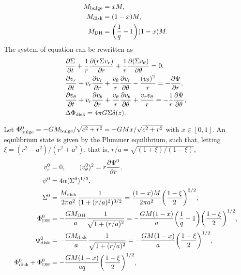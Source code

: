 \documentclass[11pt]{article}
\newcommand{\vr}{v_{r}}
\newcommand{\vt}{v_{\theta}}
\newcommand{\Sigmad}{\Sigma_{\rm{disk}}}
\newcommand{\Phib}{\Phi_{\rm{bulge}}}
\newcommand{\Phid}{\Phi_{\rm{disk}}}
\newcommand{\Phidh}{\Phi_{\rm{DH}}}
\newcommand{\Mb}{M_{\rm{bulge}}}
\newcommand{\Md}{M_{\rm{disk}}}
\newcommand{\Mdh}{M_{\rm{DH}}}
\newcommand{\Msg}{M_{\rm{sg}}}
\begin{document}
\begin{align*}
\Mb &= x M,\\
\Md &= (1 - x)M  ,\\
\Mdh &= \bigg(\frac{1}{q}-1\bigg) (1-x) M.
\end{align*}
The system of equation can be rewritten as 
\begin{align}
&\frac{\partial \Sigma}{\partial t} + \frac{1}{r} \frac{\partial(r\Sigma \vr)}{\partial r} + \frac{1}{r} \frac{\partial(\Sigma \vt)}{\partial \theta} = 0 ,\\
&\frac{\partial \vr}{\partial t} + \vr \frac{\partial \vr}{\partial r} + \frac{\vt}{r} \frac{\partial \vr}{\partial \theta} - \frac{(\vt)^2}{r} = -\frac{\partial \Psi}{\partial r} ,\\
&\frac{\partial \vt}{\partial t} + \vr \frac{\partial \vt}{\partial r} + \frac{\vt}{r} \frac{\partial \vt}{\partial \theta} + \frac{\vr\vt}{r} = -\frac{1}{r}\frac{\partial \Psi}{\partial \theta} ,\\
& \Delta \Phid = 4\pi G \Sigma \delta (z).
\end{align}

 Let $\Phib^0 = - G \Mb/\sqrt{c^2+r^2}=- G  M x/\sqrt{c^2+r^2}$ with $x\in [0,1]$. An equilibrium state is given by the Plummer equilibrium, such that,  letting $\xi = (r^2-a^2)/(r^2+a^2) $, that is, $r/a=\sqrt{(1+\xi)/(1-\xi)}$,
\begin{align}
\vr^0 &= 0,\quad \quad (\vt^0)^2 = r \frac{\partial \Psi^0}{\partial r}, \\
 \psi^0 &= 4 \alpha  (\Sigma^0)^{1/3} ,\\
 \Sigma^0 &= \frac{\Md}{2\pi a^2} \frac{1}{(1+(r/a)^2)^{3/2}} =\frac{(1-x)M}{2\pi a^2}   \bigg(\frac{1-\xi}{2}\bigg)^{3/2},\\
 \Phidh^0 &= -\frac{G \Mdh}{a } \frac{1}{\sqrt{1+(r/a)^2}} = -\frac{G M(1-x)}{a }\bigg(\frac{1}{q}-1\bigg)   \bigg(\frac{1-\xi}{2}\bigg)^{1/2} ,\\
 \Phid^0 &= -\frac{G \Md}{a } \frac{1}{\sqrt{1+(r/a)^2}} = -\frac{G M (1-x)}{a } \bigg(\frac{1-\xi}{2}\bigg)^{1/2} ,\\
 \Phid^0+\Phidh^0 &= -\frac{G M (1-x)}{a q } \bigg(\frac{1-\xi}{2}\bigg)^{1/2} ,\\
\end{align}
\end{document}
